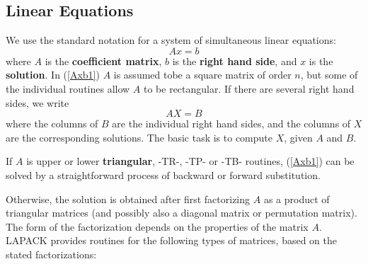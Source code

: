 \subsection{Linear Equations}\label{subseccomplineq}

We use the standard notation for a system of simultaneous linear
equations:
\begin{equation}
  A x = b        \label{Axb1}
\end{equation}
where $A$ is the {\bf coefficient matrix}, $b$ is the {\bf right hand side}, and $x$ is the {\bf solution}.
In (\ref{Axb1}) $A$ is assumed tobe a square matrix of order $n$,
but some of the individual routines allow $A$ to be rectangular.
If there are several right hand sides, we write
\begin{equation}
  A X = B        \label{AXB}
\end{equation}
where the columns of $B$ are the individual right hand sides,
and the columns of $X$ are the corresponding solutions.
The basic task is to compute $X$, given $A$ and $B$.

If $A$ is upper or lower {\bf triangular}, -TR-, -TP- or -TB- routines, (\ref{Axb1}) can be solved by a straightforward
process of backward or forward substitution.

Otherwise, the solution is obtained after first factorizing $A$ as a product of
triangular matrices (and possibly also a diagonal matrix or permutation matrix).
The form of the factorization depends on the properties of the matrix $A$.
LAPACK provides routines for the following types of matrices, based on
the stated factorizations:


